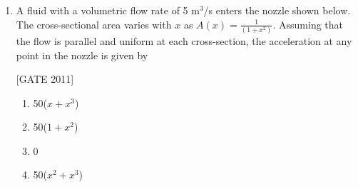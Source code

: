 \documentclass[journal,12pt,onecolumn]{IEEEtran}
\theoremstyle{remark}
\begin{document}
\begin{enumerate}
\begin{center}
\end{center}
\hfill{[GATE 2011]}
\begin{multicols}{4}
\begin{enumerate}
    \item 9215 N
    \item 10000 N
    \item 10785 N
    \item 12500 N
\end{enumerate}
\end{multicols}


\item A fluid with a volumetric flow rate of 5 m$^3$/s enters the nozzle shown below. The cross-sectional area varies with $x$ as $A(x) = \frac{1}{(1 + x^2)}$. Assuming that the flow is parallel and uniform at each cross-section, the acceleration at any point in the nozzle is given by

\begin{center}
\end{center}
\hfill{[GATE 2011]}
\begin{multicols}{4}
\begin{enumerate}
    \item 50($x + x^3$)
    \item 50($1 + x^2$)
    \item 0
    \item 50($x^2 + x^3$)
\end{enumerate}
\end{multicols}



\end{enumerate}
\end{document}

